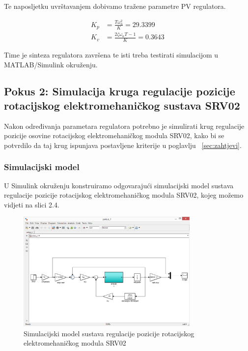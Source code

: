 \documentclass[12pt,a4paper]{article}
\begin{document}
\newpage

Te naposljetku uvrštavanjem dobivamo tražene parametre PV regulatora.

\begin{subequations}
\begin{align}
	K_p &= \frac{T\omega_n^2}{K} = 29.3399\\
	K_v &= \frac{2\zeta\omega_nT -1}{K} = 0.3643
\end{align}
\end{subequations}

Time je sinteza regulatora završena te isti treba testirati simulacijom u MATLAB/Simulink okruženju.


\subsection{Pokus 2: Simulacija kruga regulacije pozicije rotacijskog elektromehaničkog sustava SRV02}

Nakon određivanja parametara regulatora potrebno je simulirati krug regulacije pozicije osovine rotacijskog elektromehaničkog modula SRV02, kako bi se potvrdilo da taj krug ispunjava postavljene kriterije u poglavlju ~\ref{sec:zahtjevi}. 


\subsubsection{Simulacijski model}
U Simulink okruženju konstruiramo odgovarajući simulacijski model sustava regulacije pozicije rotacijskog elektromehaničkog modula SRV02, kojeg možemo vidjeti na slici 2.4.

\begin{figure}[h]
	\begin{center}
	\includegraphics[width=0.8\textwidth] {Simulator.png}
    \caption{Simulacijski model sustava regulacije pozicije rotacijskog elektromehaničkog modula SRV02}
    \end{center}
\end{figure}
\end{document}
